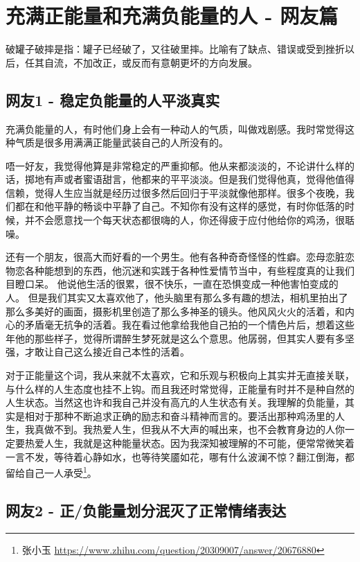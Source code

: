 ﻿%

\chapter{充满正能量和充满负能量的人 - 网友篇}

破罐子破摔是指：罐子已经破了，又往破里摔。比喻有了缺点、错误或受到挫折以后，任其自流，不加改正，或反而有意朝更坏的方向发展。

\section{网友1 - 稳定负能量的人平淡真实}

充满负能量的人，有时他们身上会有一种动人的气质，叫做戏剧感。我时常觉得这种气质是很多用满满正能量武装自己的人所没有的。

唔一好友，我觉得他算是非常稳定的严重抑郁。他从来都淡淡的，不论讲什么样的话，掷地有声或者蜜语甜言，他都来的平平淡淡。但是我们觉得他真，觉得他值得信赖，觉得人生应当就是经历过很多然后回归于平淡就像他那样。很多个夜晚，我们都在和他平静的畅谈中平静了自己。不知你有没有这样的感觉，有时你低落的时候，并不会愿意找一个每天状态都很嗨的人，你还得疲于应付他给你的鸡汤，很聒噪。

还有一个朋友，很高大而好看的一个男生。他有各种奇奇怪怪的性癖。恋母恋脏恋物恋各种能想到的东西，他沉迷和实践于各种性爱情节当中，有些程度真的让我们目瞪口呆。 他说他生活的很累，很不快乐，一直在恐惧变成一种他害怕变成的人。 但是我们其实又太喜欢他了，他头脑里有那么多有趣的想法，相机里拍出了那么多美好的画面，摄影机里创造了那么多神圣的镜头。他风风火火的活着，和内心的矛盾毫无抗争的活着。我在看过他拿给我他自己拍的一个情色片后，想着这些年他的那些样子，觉得所谓醉生梦死就是这么个意思。他孱弱，但其实人要有多坚强，才敢让自己这么接近自己本性的活着。

对于正能量这个词，我从来就不太喜欢，它和乐观与积极向上其实并无直接关联，与什么样的人生态度也挂不上钩。而且我还时常觉得，正能量有时并不是种自然的人生状态。当然这也许和我自己并没有高亢的人生状态有关。我理解的负能量，其实是相对于那种不断追求正确的励志和奋斗精神而言的。要活出那种鸡汤里的人生，我真做不到。我热爱人生，但我从不大声的喊出来，也不会教育身边的人你一定要热爱人生，我就是这种能量状态。因为我深知被理解的不可能，便常常微笑着一言不发，等待着心静如水，也等待笑靥如花，哪有什么波澜不惊？翻江倒海，都留给自己一人承受\footnote{张小玉 \quad \url{https://www.zhihu.com/question/20309007/answer/20676880}}。

\section{网友2 - 正/负能量划分泯灭了正常情绪表达}


